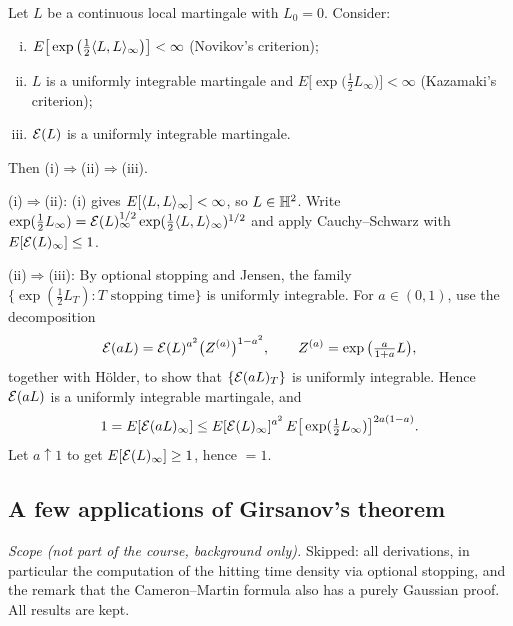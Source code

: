 \begin{theorem}\label{chap5.5:theorem-novikov_kazamaki}
\\
Let $L$ be a continuous local martingale with $L_0=0$. Consider:
\begin{enumerate}[(i)]
    \item $E\big[\exp\big(\frac12\langle L,L\rangle_\infty\big)\big]<\infty$ \quad (Novikov's criterion);
    \item $L$ is a uniformly integrable martingale and $E\big[\exp\big(\frac12L_\infty\big)\big]<\infty$ \quad (Kazamaki's criterion);
    \item $\mathcal{E}(L)$ is a uniformly integrable martingale.
\end{enumerate}
Then (i)$\Rightarrow$(ii)$\Rightarrow$(iii).
\end{theorem}

\begin{proofidea}
(i)$\Rightarrow$(ii): (i) gives $E[\langle L,L\rangle_\infty]<\infty$, so $L\in\mathbb{H}^2$. Write $\exp(\frac12L_\infty)=\mathcal{E}(L)_\infty^{1/2}\exp(\frac12\langle L,L\rangle_\infty)^{1/2}$ and apply Cauchy--Schwarz with $E[\mathcal{E}(L)_\infty]\leq1$.

(ii)$\Rightarrow$(iii): By optional stopping and Jensen, the family $\{\exp(\frac12L_T):T\text{ stopping time}\}$ is uniformly integrable. For $a\in(0,1)$, use the decomposition
$$\mathcal{E}(aL)=\mathcal{E}(L)^{a^2}\big(Z^{(a)}\big)^{1-a^2},\qquad Z^{(a)}=\exp\big(\tfrac{a}{1+a}L\big),$$
together with Hölder, to show that $\{\mathcal{E}(aL)_T\}$ is uniformly integrable. Hence $\mathcal{E}(aL)$ is a uniformly integrable martingale, and
$$1=E[\mathcal{E}(aL)_\infty]\leq E[\mathcal{E}(L)_\infty]^{a^2}\,E\big[\exp(\tfrac12L_\infty)\big]^{2a(1-a)}.$$
Let $a\uparrow1$ to get $E[\mathcal{E}(L)_\infty]\geq1$, hence $=1$.
\end{proofidea}

\subsection{A few applications of Girsanov's theorem}
\noindent\textit{Scope (not part of the course, background only).} Skipped: all derivations, in particular the computation of the hitting time density via optional stopping, and the remark that the Cameron--Martin formula also has a purely Gaussian proof. All results are kept.

